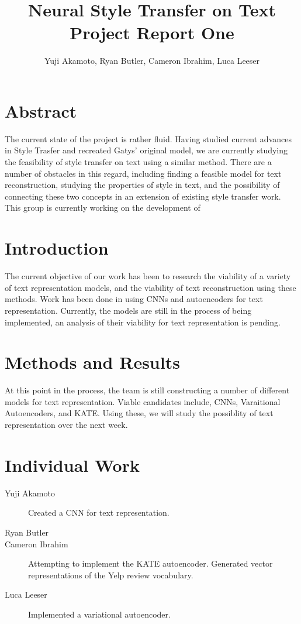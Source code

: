 \documentclass{article}
\title{Neural Style Transfer on Text\\Project Report One}
\author{Yuji Akamoto, Ryan Butler, Cameron Ibrahim, Luca Leeser}
\begin{document}
\maketitle

\section*{Abstract}

The current state of the project is rather fluid. Having studied current advances
in Style Trasfer and recreated Gatys' original model, we are currently studying
the feasibility of style transfer on text using a similar method. There are a number
of obstacles in this regard, including finding a feasible model for text reconstruction,
studying the properties of style in text, and the possibility of connecting these
two concepts in an extension of existing style transfer work. This group is currently
working on the development of 

\section{Introduction}

The current objective of our work has been to research the viability of a variety of text representation models, and the viability of text reconstruction using these methods. Work has been done in using CNNs and autoencoders for text representation. Currently,
the models are still in the process of being implemented, an analysis of their viability for text representation is pending.


\section{Methods and Results}

At this point in the process, the team is still constructing a number of different models
for text representation. Viable candidates include, CNNs, Varaitional Autoencoders, and KATE. Using these, we will study the possiblity of text representation over the next week.

\section{Individual Work}

\begin{description}

	\item [Yuji Akamoto]
		Created a CNN for text representation.

	\item [Ryan Butler]

	\item [Cameron Ibrahim]
		Attempting to implement the KATE autoencoder.
		Generated vector representations of the Yelp review vocabulary. 

	\item [Luca Leeser]
		Implemented a variational autoencoder.

\end{description}
\end{document}
